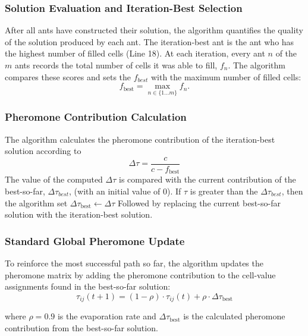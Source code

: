 \subsubsection{Solution Evaluation and Iteration-Best Selection}
 After all ants have constructed their solution, the algorithm quantifies the quality of the solution produced by each ant. The iteration-best ant is the ant who has the highest number of filled cells (Line 18). 
At each iteration, every ant $n$ of the $m$ ants records the total number of cells it was able to fill, $f_n$. The algorithm compares these scores and sets the $f_{best}$ with the maximum number of filled cells: 
\begin{equation}
    f_{\text{best}} = \max_{n \in \{1 \dots m\}} f_n.
    \label{eqn:iteration-best-ant}
\end{equation}

\subsubsection{Pheromone Contribution Calculation}
The algorithm calculates the pheromone contribution of the iteration-best solution according to \begin{equation}
    \Delta\tau = \frac{\textit{c}}{\textit{c} - f_{\text{best}}}
    \label{eqn:phertoadd}
\end{equation}
The value of the computed $\Delta\tau$ is compared with the current contribution of the best-so-far, $\Delta \tau_{best}$, (with an initial value of 0). If $\tau$ is greater than the $\Delta \tau_{best}$, then the algorithm set $\Delta \tau_{\text{best}} \leftarrow \Delta \tau$
Followed by replacing the current best-so-far solution with the iteration-best solution.

\subsubsection{Standard Global Pheromone Update}
To reinforce the most successful path so far, the algorithm updates the pheromone matrix by adding the pheromone contribution to the cell-value assignments found in the best-so-far solution: 
\begin{equation}
    \tau_{ij}(t+1) = (1-\rho) \cdot \tau_{ij}(t) + \rho \cdot \Delta\tau_{\text{best}}
\label{eqn:stdglobalupdate}
\end{equation}

where $\rho = 0.9$ is the evaporation rate and $\Delta\tau_{\text{best}}$ is the calculated pheromone contribution from the best-so-far solution. 

